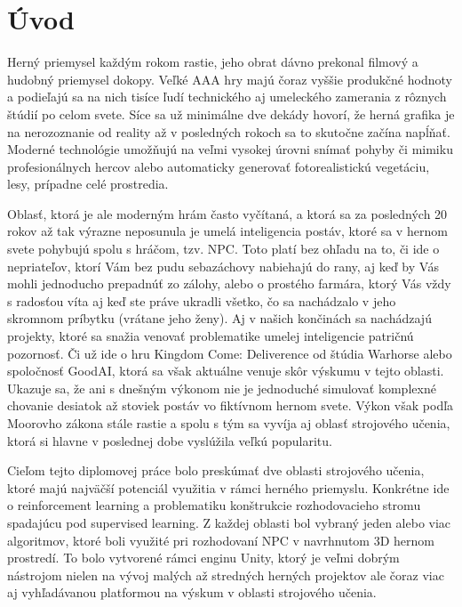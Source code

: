 \documentclass[slovak, master]{diploma}
\begin{document}
\MakeTitlePages

\listoffigures
\clearpage

\listoftables
\clearpage

\lstlistoflistings
\clearpage

\chapter{Úvod}
\label{sec:Introduction}
Herný priemysel každým rokom rastie, jeho obrat dávno prekonal filmový a hudobný priemysel dokopy. Veľké AAA hry majú čoraz vyššie produkčné hodnoty a podieľajú sa na nich tisíce ľudí technického aj umeleckého zamerania z rôznych štúdií po celom svete. Síce sa už minimálne dve dekády hovorí, že herná grafika je na nerozoznanie od reality až v posledných rokoch sa to skutočne začína napĺňať. Moderné technológie umožňujú na veľmi vysokej úrovni snímať pohyby či mimiku profesionálnych hercov alebo automaticky generovať fotorealistickú vegetáciu, lesy, prípadne celé prostredia. 

Oblasť, ktorá je ale moderným hrám často vyčítaná, a ktorá sa za posledných 20 rokov až tak výrazne neposunula je umelá inteligencia postáv, ktoré sa v hernom svete pohybujú spolu s hráčom, tzv. NPC. Toto platí bez ohľadu na to, či ide o nepriateľov, ktorí Vám bez pudu sebazáchovy nabiehajú do rany, aj keď by Vás mohli jednoducho prepadnúť zo zálohy, alebo o prostého farmára, ktorý Vás vždy s radosťou víta aj keď ste práve ukradli všetko, čo sa nachádzalo v jeho skromnom príbytku (vrátane jeho ženy). Aj v našich končinách sa nachádzajú projekty, ktoré sa snažia venovať problematike umelej inteligencie patričnú pozornosť. Či už ide o hru Kingdom Come: Deliverence od štúdia Warhorse alebo spoločnosť GoodAI, ktorá sa však aktuálne venuje skôr výskumu v tejto oblasti. Ukazuje sa, že ani s dnešným výkonom nie je jednoduché simulovať komplexné chovanie desiatok až stoviek postáv vo fiktívnom hernom svete. Výkon však podľa Moorovho zákona stále rastie a spolu s tým sa vyvíja aj oblasť strojového učenia, ktorá si hlavne v poslednej dobe vyslúžila veľkú popularitu.

Cieľom tejto diplomovej práce bolo preskúmať dve oblasti strojového učenia, ktoré majú najväčší potenciál využitia v rámci herného priemyslu. Konkrétne ide o reinforcement learning a problematiku konštrukcie rozhodovacieho stromu spadajúcu pod supervised learning. Z každej oblasti bol vybraný jeden alebo viac algoritmov, ktoré boli využité pri rozhodovaní NPC v navrhnutom 3D hernom prostredí. To bolo vytvorené rámci enginu Unity, ktorý je veľmi dobrým nástrojom nielen na vývoj malých až stredných herných projektov ale čoraz viac aj vyhľadávanou platformou na výskum v oblasti strojového učenia. 
\end{document}

